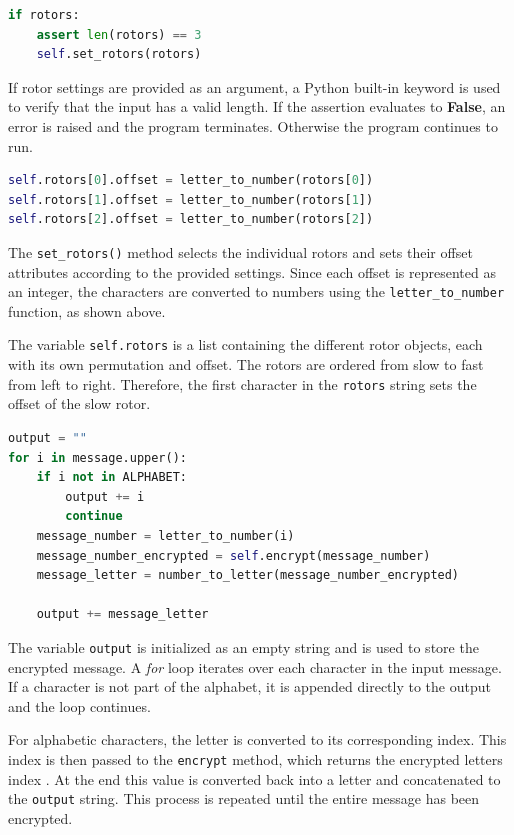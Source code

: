 \documentclass{article}
\begin{document}
\begin{lstlisting}[language=Python]
if rotors:
    assert len(rotors) == 3
    self.set_rotors(rotors)
\end{lstlisting}

If rotor settings are provided as an argument, a Python built-in keyword is used to verify that the input has a valid length. If the assertion evaluates to \textbf{False}, an error is raised and the program terminates. Otherwise the program continues to run.

\begin{lstlisting}[language=Python]
self.rotors[0].offset = letter_to_number(rotors[0])
self.rotors[1].offset = letter_to_number(rotors[1])
self.rotors[2].offset = letter_to_number(rotors[2])
\end{lstlisting}

The \verb|set_rotors()| method selects the individual rotors and sets their offset attributes according to the provided settings. Since each offset is represented as an integer, the characters are converted to numbers using the \verb|letter_to_number| function, as shown above.

The variable \verb|self.rotors| is a list containing the different rotor objects, each with its own permutation and offset. The rotors are ordered from slow to fast from left to right. Therefore, the first character in the \verb|rotors| string sets the offset of the slow rotor.

\newpage

\begin{lstlisting}[language=Python]
output = ""
for i in message.upper():
    if i not in ALPHABET:
        output += i
        continue
    message_number = letter_to_number(i)
    message_number_encrypted = self.encrypt(message_number)
    message_letter = number_to_letter(message_number_encrypted)

    output += message_letter


\end{lstlisting}

The variable \verb|output| is initialized as an empty string and is used to store the encrypted message. A \textit{for} loop iterates over each character in the input message. If a character is not part of the alphabet, it is appended directly to the output and the loop continues.

For alphabetic characters, the letter is converted to its corresponding  index. This index is then passed to the \verb|encrypt| method, which returns the encrypted letters index . At the end this value is converted back into a letter and concatenated to the \verb|output| string. This process is repeated until the entire message has been encrypted.
\end{document}
